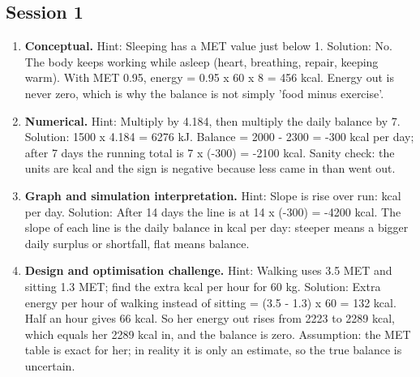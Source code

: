 \documentclass[11pt,a4paper]{article}
\begin{document}
\subsection*{Session 1}
\begin{enumerate}[nosep]
\item \textbf{Conceptual.} Hint: Sleeping has a MET value just below 1. Solution: No. The body keeps working while asleep (heart, breathing, repair, keeping warm). With MET 0.95, energy = 0.95 x 60 x 8 = 456 kcal. Energy out is never zero, which is why the balance is not simply 'food minus exercise'.
\item \textbf{Numerical.} Hint: Multiply by 4.184, then multiply the daily balance by 7. Solution: 1500 x 4.184 = 6276 kJ. Balance = 2000 - 2300 = -300 kcal per day; after 7 days the running total is 7 x (-300) = -2100 kcal. Sanity check: the units are kcal and the sign is negative because less came in than went out.
\item \textbf{Graph and simulation interpretation.} Hint: Slope is rise over run: kcal per day. Solution: After 14 days the line is at 14 x (-300) = -4200 kcal. The slope of each line is the daily balance in kcal per day: steeper means a bigger daily surplus or shortfall, flat means balance.
\item \textbf{Design and optimisation challenge.} Hint: Walking uses 3.5 MET and sitting 1.3 MET; find the extra kcal per hour for 60 kg. Solution: Extra energy per hour of walking instead of sitting = (3.5 - 1.3) x 60 = 132 kcal. Half an hour gives 66 kcal. So her energy out rises from 2223 to 2289 kcal, which equals her 2289 kcal in, and the balance is zero. Assumption: the MET table is exact for her; in reality it is only an estimate, so the true balance is uncertain.
\end{enumerate}
\end{document}
